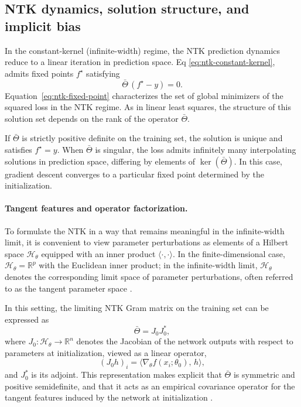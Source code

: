 \subsection{NTK dynamics, solution structure, and implicit bias}

In the constant-kernel (infinite-width) regime, the NTK prediction dynamics
reduce to a linear iteration in prediction space. Eq \ref{eq:ntk-constant-kernel},
admits fixed points $f^\star$ satisfying
\begin{equation}
	\bar\Theta\,(f^\star - y) = 0.
	\label{eq:ntk-fixed-point}
\end{equation}
Equation~\eqref{eq:ntk-fixed-point} characterizes the set of global minimizers of
the squared loss in the NTK regime. As in linear least squares, the structure of
this solution set depends on the rank of the operator $\bar\Theta$.

If $\bar\Theta$ is strictly positive definite on the training set, the solution
is unique and satisfies $f^\star = y$. When $\bar\Theta$ is singular, the loss
admits infinitely many interpolating solutions in prediction space, differing
by elements of $\ker(\bar\Theta)$. In this case, gradient descent converges to a
particular fixed point determined by the initialization.

\paragraph{Tangent features and operator factorization.}
To formulate the NTK in a way that remains meaningful in the infinite-width
limit, it is convenient to view parameter perturbations as elements of a
Hilbert space $\mathcal{H}_\theta$ equipped with an inner product
$\langle\cdot,\cdot\rangle$. In the finite-dimensional case,
$\mathcal{H}_\theta=\mathbb{R}^p$ with the Euclidean inner product; in the
infinite-width limit, $\mathcal{H}_\theta$ denotes the corresponding limit
space of parameter perturbations, often referred to as the tangent parameter
space \citep{jacot2018ntk, lee2020wide}.

In this setting, the limiting NTK Gram matrix on the training set can be
expressed as
\begin{equation}
	\bar\Theta = J_0 J_0^\ast,
\end{equation}
where $J_0 : \mathcal{H}_\theta \to \mathbb{R}^n$ denotes the Jacobian of the
network outputs with respect to parameters at initialization, viewed as a
linear operator,
\[
	(J_0 h)_i = \langle \nabla_\theta f(x_i;\theta_0),\,h\rangle,
\]
and $J_0^\ast$ is its adjoint. This representation makes explicit that
$\bar\Theta$ is symmetric and positive semidefinite, and that it acts as an
empirical covariance operator for the tangent features induced by the network
at initialization \citep{jacot2018ntk}.

